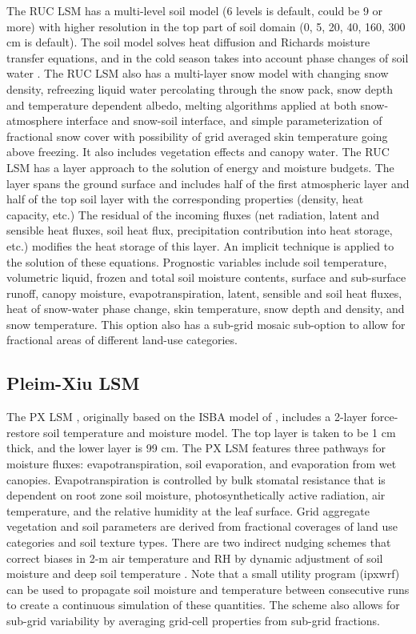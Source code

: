 The RUC LSM has a multi-level soil model (6 levels is default, could be 9 or more) with higher resolution in the top part of soil domain 
(0, 5, 20, 40, 160, 300 cm is default). The soil model solves heat diffusion and Richards moisture transfer equations, and in the cold season
takes into account phase changes of soil water \citep{smirnova97, smirnova00}. 
The RUC LSM also has a multi-layer snow model with changing snow density, refreezing liquid water 
percolating through the snow pack, snow depth and temperature dependent albedo, melting algorithms applied at both 
snow-atmosphere interface and snow-soil interface, and simple parameterization of fractional snow cover with possibility of 
grid averaged skin temperature going above freezing. It also includes vegetation effects and canopy water.
The RUC LSM has a layer approach to the solution of energy and moisture budgets. 
The layer spans the ground surface and includes half of the first atmospheric layer and half of the top soil layer with the 
corresponding properties (density, heat capacity, etc.) The residual of the incoming fluxes (net radiation, latent and sensible heat fluxes, 
soil heat flux, precipitation contribution into heat storage, etc.) modifies the heat storage of this layer. 
An implicit technique is applied to the solution of these equations.
Prognostic variables include soil temperature, volumetric liquid, frozen and total soil moisture contents, 
surface and sub-surface runoff, canopy moisture, evapotranspiration, latent, sensible and soil heat fluxes, 
heat of snow-water phase change, skin temperature, snow depth and density, and snow temperature. 
This option also has a sub-grid mosaic sub-option to allow for fractional areas of different land-use categories.

\subsection{Pleim-Xiu LSM}

The PX LSM \citep{pleim95, xiu01}, originally based on the ISBA model of \citet{noilhan89}, includes a 2-layer force-restore soil temperature and moisture model.  The top layer is taken to be 1 cm thick, and the lower layer is 99 cm. The PX LSM features three pathways for moisture fluxes: evapotranspiration, soil evaporation, and evaporation from wet canopies.  Evapotranspiration is controlled by bulk stomatal resistance that is dependent on root zone soil moisture, photosynthetically active radiation, air temperature, and the relative humidity at the leaf surface.   Grid aggregate vegetation and soil parameters are derived from fractional coverages of land use categories and soil texture types.  There are two indirect nudging schemes that correct biases in 2-m air temperature and RH by dynamic adjustment of soil moisture \citep{pleim03} and deep soil temperature \citep{pleim08}.  Note that a small utility program (ipxwrf) can be used to propagate soil moisture and temperature between consecutive runs to create a continuous simulation of these quantities. The scheme also
allows for sub-grid variability by averaging grid-cell properties from sub-grid fractions.

